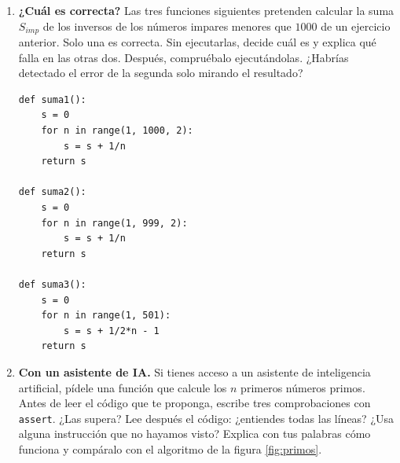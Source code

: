 \begin{enumerate}
\item \textbf{¿Cuál es correcta?} Las tres funciones siguientes pretenden calcular la suma $S_{imp}$ de los inversos de los números impares menores que $1000$ de un ejercicio anterior. Solo una es correcta. Sin ejecutarlas, decide cuál es y explica qué falla en las otras dos. Después, compruébalo ejecutándolas. ¿Habrías detectado el error de la segunda solo mirando el resultado?
\begin{verbatim}
def suma1():
    s = 0
    for n in range(1, 1000, 2):
        s = s + 1/n
    return s

def suma2():
    s = 0
    for n in range(1, 999, 2):
        s = s + 1/n
    return s

def suma3():
    s = 0
    for n in range(1, 501):
        s = s + 1/2*n - 1
    return s
\end{verbatim}

\item \textbf{Con un asistente de IA.} Si tienes acceso a un asistente de inteligencia artificial, pídele una función que calcule los $n$ primeros números primos. Antes de leer el código que te proponga, escribe tres comprobaciones con \texttt{assert}. ¿Las supera? Lee después el código: ¿entiendes todas las líneas? ¿Usa alguna instrucción que no hayamos visto? Explica con tus palabras cómo funciona y compáralo con el algoritmo de la figura \ref{fig:primos}.
\end{enumerate}

\newpage
